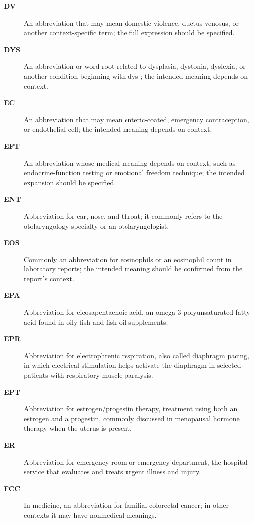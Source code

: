 \begin{description}
\item[\textbf{DV}] An abbreviation that may mean domestic violence, ductus venosus, or another context-specific term; the full expression should be specified.

\item[\textbf{DYS}] An abbreviation or word root related to dysplasia, dystonia, dyslexia, or another condition beginning with dys-; the intended meaning depends on context.

\item[\textbf{EC}] An abbreviation that may mean enteric-coated, emergency contraception, or endothelial cell; the intended meaning depends on context.

\item[\textbf{EFT}] An abbreviation whose medical meaning depends on context, such as endocrine-function testing or emotional freedom technique; the intended expansion should be specified.

\item[\textbf{ENT}] Abbreviation for ear, nose, and throat; it commonly refers to the otolaryngology specialty or an otolaryngologist.

\item[\textbf{EOS}] Commonly an abbreviation for eosinophils or an eosinophil count in laboratory reports; the intended meaning should be confirmed from the report's context.

\item[\textbf{EPA}] Abbreviation for eicosapentaenoic acid, an omega-3 polyunsaturated fatty acid found in oily fish and fish-oil supplements.

\item[\textbf{EPR}] Abbreviation for electrophrenic respiration, also called diaphragm pacing, in which electrical stimulation helps activate the diaphragm in selected patients with respiratory muscle paralysis.

\item[\textbf{EPT}] Abbreviation for estrogen/progestin therapy, treatment using both an estrogen and a progestin, commonly discussed in menopausal hormone therapy when the uterus is present.

\item[\textbf{ER}] Abbreviation for emergency room or emergency department, the hospital service that evaluates and treats urgent illness and injury.

\item[\textbf{FCC}] In medicine, an abbreviation for familial colorectal cancer; in other contexts it may have nonmedical meanings.


\end{description}
